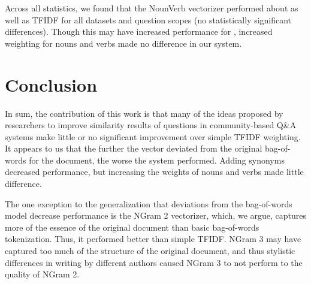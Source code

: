 \documentclass{acm_proc_article-sp}
\begin{document}
	Across all statistics, we found that the NounVerb vectorizer performed about as well as TFIDF for all datasets and question scopes (no statistically significant differences). Though this may have increased performance for \cite{wang2009syntactic}, increased weighting for nouns and verbs  made no difference in our system.

\balance


\section{Conclusion}
In sum, the contribution of this work is that many of the ideas proposed by researchers to improve similarity results of questions in community-based Q\&A systems make little or no significant improvement over simple TFIDF weighting. It appears to us that the further the vector deviated from the original bag-of-words for the document, the worse the system performed. Adding synonyms decreased performance, but increasing the weights of nouns and verbs made little difference. 

The one exception to the generalization that deviations from the bag-of-words model decrease performance is the NGram 2 vectorizer, which, we argue, captures more of the essence of the original document than basic bag-of-words tokenization. Thus, it performed better than simple TFIDF. NGram 3 may have captured too much of the structure of the original document, and thus stylistic differences in writing by different authors caused NGram 3 to not perform to the quality of NGram 2.


%

%
%
\end{document}

